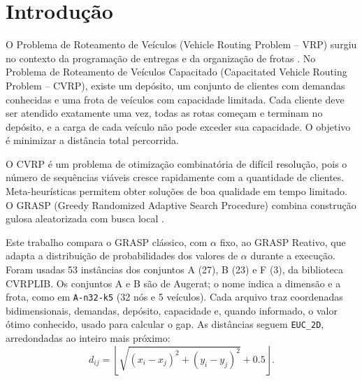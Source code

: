\section{Introdução}

O Problema de Roteamento de Veículos (Vehicle Routing Problem -- VRP) surgiu no contexto da programação de entregas e da organização de frotas \cite{dantzig1959}. No Problema de Roteamento de Veículos Capacitado (Capacitated Vehicle Routing Problem -- CVRP), existe um depósito, um conjunto de clientes com demandas conhecidas e uma frota de veículos com capacidade limitada. Cada cliente deve ser atendido exatamente uma vez, todas as rotas começam e terminam no depósito, e a carga de cada veículo não pode exceder sua capacidade. O objetivo é minimizar a distância total percorrida.

O CVRP é um problema de otimização combinatória de difícil resolução, pois o número de sequências viáveis cresce rapidamente com a quantidade de clientes. Meta-heurísticas permitem obter soluções de boa qualidade em tempo limitado. O GRASP (Greedy Randomized Adaptive Search Procedure) combina construção gulosa aleatorizada com busca local \cite{feo1989,resende2019}.

Este trabalho compara o GRASP clássico, com $\alpha$ fixo, ao GRASP Reativo, que adapta a distribuição de probabilidades dos valores de $\alpha$ durante a execução. Foram usadas 53 instâncias dos conjuntos A (27), B (23) e F (3), da biblioteca CVRPLIB. Os conjuntos A e B são de Augerat; o nome indica a dimensão e a frota, como em \texttt{A-n32-k5} (32 nós e 5 veículos). Cada arquivo traz coordenadas bidimensionais, demandas, depósito, capacidade e, quando informado, o valor ótimo conhecido, usado para calcular o gap. As distâncias seguem \texttt{EUC\_2D}, arredondadas ao inteiro mais próximo:
\begin{equation}
d_{ij}=\left\lfloor\sqrt{(x_i-x_j)^2+(y_i-y_j)^2}+0.5\right\rfloor.
\end{equation}
